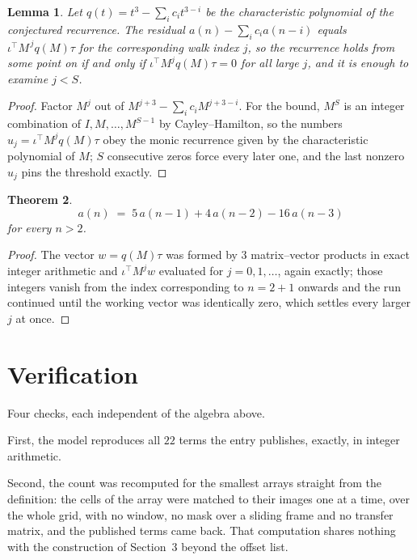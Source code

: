 \documentclass[11pt,a4paper]{article}
\theoremstyle{plain}
\newtheorem{theorem}{Theorem}
\newtheorem{lemma}[theorem]{Lemma}
\theoremstyle{definition}
\begin{document}
\begin{lemma}\label{lem:crit}
Let $q(t)=t^{3}-\sum_i c_it^{3-i}$ be the characteristic polynomial of the
conjectured recurrence. The residual $a(n)-\sum_ic_ia(n-i)$ equals
$\iota^{\!\top}M^{\,j}q(M)\tau$ for the corresponding walk index $j$, so the recurrence
holds from some point on if and only if $\iota^{\!\top}M^{j}q(M)\tau=0$ for all large $j$,
and it is enough to examine $j<S$.
\end{lemma}

\begin{proof}
Factor $M^{j}$ out of $M^{j+3}-\sum_ic_iM^{j+3-i}$. For the bound, $M^{S}$
is an integer combination of $I,M,\dots,M^{S-1}$ by Cayley--Hamilton, so the numbers
$u_j=\iota^{\!\top}M^{j}q(M)\tau$ obey the monic recurrence given by the characteristic
polynomial of $M$; $S$ consecutive zeros force every later one, and the last nonzero $u_j$
pins the threshold exactly.
\end{proof}

\begin{theorem}
\[
a(n)\;=\;5\,a(n-1) + 4\,a(n-2) - 16\,a(n-3)
\]
for every $n>2$.
\end{theorem}

\begin{proof}
The vector $w=q(M)\tau$ was formed by $3$ matrix--vector products in exact integer
arithmetic and $\iota^{\!\top}M^{j}w$ evaluated for $j=0,1,\dots$, again exactly; those
integers vanish from the index corresponding to $n=2+1$ onwards and the run continued
until the working vector was identically zero, which settles every larger $j$ at once.
\end{proof}

\section{Verification}

Four checks, each independent of the algebra above.

First, the model reproduces all $22$ terms the entry publishes, exactly, in integer
arithmetic.

Second, the count was recomputed for the smallest arrays straight from the definition: the
cells of the array were matched to their images one at a time, over the whole grid, with no
window, no mask over a sliding frame and no transfer matrix, and the published terms came back.
That computation shares nothing with the construction of Section~3 beyond the offset list.
\end{document}
